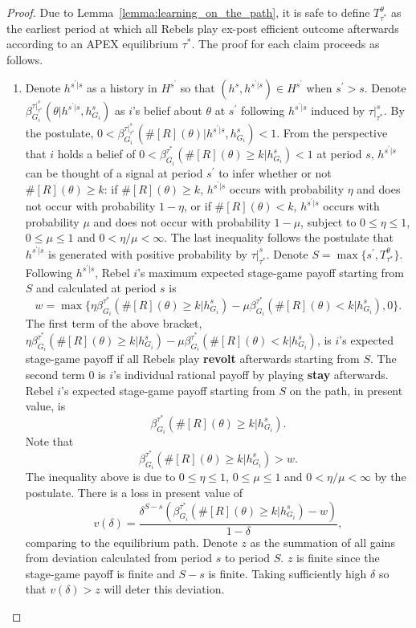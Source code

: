 \documentclass[12pt,letter]{article}
\theoremstyle{definition}
\theoremstyle{remark}
\theoremstyle{claim}
\begin{document}
\begin{proof}
Due to Lemma~\ref{lemma:learning_on_the_path}, it is safe to define $T^{\theta}_{\tau^{*}}$ as the earliest period at which all Rebels play ex-post efficient outcome afterwards according to an APEX equilibrium $\tau^{*}$. 
The proof for each claim proceeds as follows. 
\begin{enumerate}[label=(\arabic*)]
\item Denote $h^{s^{'}|s}$ as a history in $H^{s^{'}}$ so that $(h^s,h^{s^{'}|s})\in H^{s^{'}}$ when $s^{'}>s$. Denote $\beta^{\tau|^s_{\tau^{*}}}_{G_i}(\theta|h^{s^{'}|s}, h^s_{G_i})$ as $i$'s belief about $\theta$ at $s^{'}$ following $h^{s^{'}|s}$ induced by $\tau|^s_{\tau^{*}}$. By the postulate,  $0<\beta^{\tau|^s_{\tau^{*}}}_{G_i}(\#[R](\theta)|h^{s^{'}|s}, h^s_{G_i})<1$. From the perspective that $i$ holds a belief of $0<\beta^{\tau^{*}}_{G_i}(\#[R](\theta)\geq k|h^s_{G_i})<1$ at period $s$, $h^{s^{'}|s}$ can be thought of a signal at period $s^{'}$ to infer whether or not $\#[R](\theta)\geq k$: if $\#[R](\theta)\geq k$, $h^{s^{'}|s}$ occurs with probability $\eta$ and does not occur with probability $1-\eta$, or if $\#[R](\theta)< k$, $h^{s^{'}|s}$ occurs with probability $\mu$ and does not occur with probability $1-\mu$, subject to $0\leq \eta \leq 1$, $0\leq\mu\leq 1$ and $0<\eta/\mu<\infty$. The last inequality follows the postulate that $h^{s^{'}|s}$ is generated with positive probability by $\tau|^s_{\tau^{*}}$. Denote $S=\max\{s^{'}, T^{\theta}_{\tau^{*}}\}$. Following $h^{s^{'}|s}$, Rebel $i$'s maximum expected stage-game payoff starting from $S$ and calculated at period $s$ is 
\[w=\max\{\eta\beta^{\tau^{*}}_{G_i}(\#[R](\theta)\geq k|h^s_{G_i})-\mu\beta^{\tau^{*}}_{G_i}(\#[R](\theta)< k|h^s_{G_i}),0\}.\]
The first term of the above bracket, $\eta\beta^{\tau^{*}}_{G_i}(\#[R](\theta)\geq k|h^s_{G_i})-\mu\beta^{\tau^{*}}_{G_i}(\#[R](\theta)< k|h^s_{G_i})$, is $i$'s expected stage-game payoff if all Rebels play \textbf{revolt} afterwards starting from $S$.  The second term $0$ is $i$'s individual rational payoff by playing \textbf{stay} afterwards. Rebel $i$'s expected stage-game payoff starting from $S$ on the path, in present value, is 
\[\beta^{\tau^{*}}_{G_i}(\#[R](\theta)\geq k|h^s_{G_i}).\] 
Note that
\[\beta^{\tau^{*}}_{G_i}(\#[R](\theta)\geq k|h^s_{G_i})>w.\]
The inequality above is due to $0\leq \eta \leq 1$, $0\leq\mu\leq 1$ and $0<\eta/\mu<\infty$ by the postulate. There is a loss in present value of
\[v(\delta)=\frac{\delta^{S-s}(\beta^{\tau^{*}}_{G_i}(\#[R](\theta)\geq k|h^s_{G_i})-w)}{1-\delta},\]
comparing to the equilibrium path. Denote $z$ as the summation of all gains from deviation calculated from period $s$ to period $S$. $z$ is finite since the stage-game payoff is finite and $S-s$ is finite. Taking sufficiently high $\delta$ so that $v(\delta)>z$ will deter this deviation.


\end{enumerate}
\end{proof}
\end{document}
